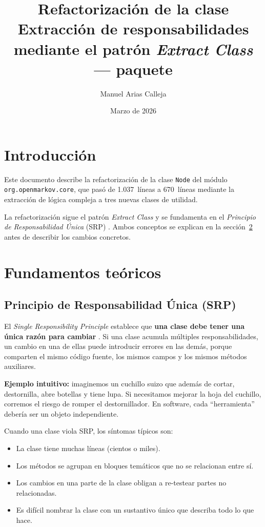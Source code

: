 \documentclass[11pt,a4paper]{article}
\title{Refactorizaci\'on de la clase \code{Node}\\
       \large Extracci\'on de responsabilidades mediante el patr\'on
              \emph{Extract Class}\\[4pt]
       \normalsize \code{org.openmarkov.core} --- paquete \code{model.network}}
\author{Manuel Arias Calleja}
\date{Marzo de 2026}
\newcommand{\code}[1]{\texttt{#1}}
\begin{document}
\maketitle
\tableofcontents
\newpage

\section{Introducci\'on}

Este documento describe la refactorizaci\'on de la clase \code{Node} del
m\'odulo \code{org.openmarkov.core}, que pas\'o de 1.037~l\'ineas a
670~l\'ineas mediante la extracci\'on de l\'ogica compleja a tres nuevas
clases de utilidad.

La refactorizaci\'on sigue el patr\'on \emph{Extract Class}
\cite{fowler2019} y se fundamenta en el \emph{Principio de
Responsabilidad \'Unica} (SRP) \cite{martin2003}.  Ambos conceptos se
explican en la secci\'on~\ref{sec:teoria} antes de describir los cambios
concretos.

\section{Fundamentos te\'oricos}
\label{sec:teoria}

\subsection{Principio de Responsabilidad \'Unica (SRP)}

El \emph{Single Responsibility Principle} establece que \textbf{una clase
debe tener una \'unica raz\'on para cambiar} \cite{martin2003}.  Si una
clase acumula m\'ultiples responsabilidades, un cambio en una de ellas
puede introducir errores en las dem\'as, porque comparten el mismo
c\'odigo fuente, los mismos campos y los mismos m\'etodos auxiliares.

\textbf{Ejemplo intuitivo:} imaginemos un cuchillo suizo que adem\'as de
cortar, destornilla, abre botellas y tiene lupa.  Si necesitamos mejorar
la hoja del cuchillo, corremos el riesgo de romper el destornillador.
En software, cada ``herramienta'' deber\'ia ser un objeto independiente.

Cuando una clase viola SRP, los s\'intomas t\'ipicos son:

\begin{itemize}
  \item La clase tiene muchas l\'ineas (cientos o miles).
  \item Los m\'etodos se agrupan en bloques tem\'aticos que no se
        relacionan entre s\'i.
  \item Los cambios en una parte de la clase obligan a re-testear partes
        no relacionadas.
  \item Es dif\'icil nombrar la clase con un sustantivo \'unico que
        describa todo lo que hace.
\end{itemize}
\end{document}
